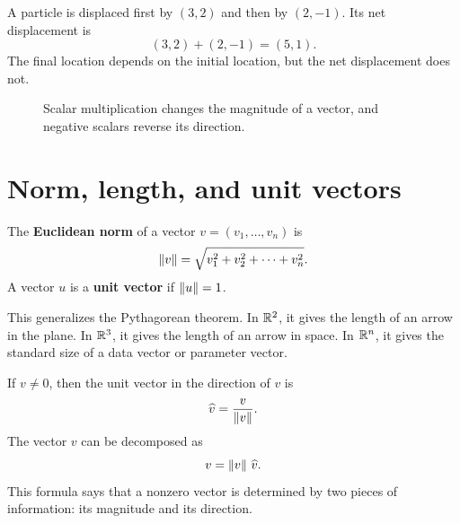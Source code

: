 \begin{examplebox}[title={Example 3.2: Net displacement}]
A particle is displaced first by $(3,2)$ and then by $(2,-1)$. Its net displacement is
\[
  (3,2)+(2,-1)=(5,1).
\]
The final location depends on the initial location, but the net displacement does not.
\end{examplebox}

\begin{figure}[H]
\centering
{}
\caption{Scalar multiplication changes the magnitude of a vector, and negative scalars reverse its direction.}
\end{figure}

\section{Norm, length, and unit vectors}

\begin{definitionbox}
The \textbf{Euclidean norm} of a vector $v=(v_1,\ldots,v_n)$ is
\[
  \left\lVert v\right\rVert=\sqrt{v_1^2+v_2^2+\cdots+v_n^2}.
\]
A vector $u$ is a \textbf{unit vector} if $\left\lVert u\right\rVert=1$.
\end{definitionbox}

This generalizes the Pythagorean theorem. In $\mathbb{R}^2$, it gives the length of an arrow in the plane. In $\mathbb{R}^3$, it gives the length of an arrow in space. In $\mathbb{R}^n$, it gives the standard size of a data vector or parameter vector.

If $v\ne 0$, then the unit vector in the direction of $v$ is
\[
  \widehat v=\frac{v}{\left\lVert v\right\rVert}.
\]
The vector $v$ can be decomposed as
\[
  v=\left\lVert v\right\rVert\,\widehat v.
\]
This formula says that a nonzero vector is determined by two pieces of information: its magnitude and its direction.

